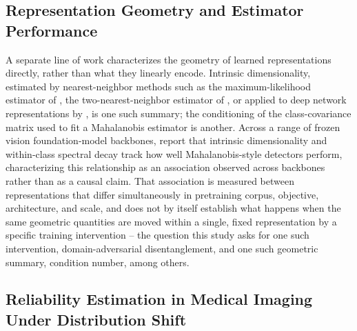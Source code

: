 \subsection{Representation Geometry and Estimator Performance}
\label{sec:rw-geometry}

A separate line of work characterizes the geometry of learned representations directly, rather than what they linearly encode. Intrinsic dimensionality, estimated by nearest-neighbor methods such as the maximum-likelihood estimator of \citet{levina2004maximum}, the two-nearest-neighbor estimator of \citet{facco2017estimating}, or applied to deep network representations by \citet{ansuini2019intrinsic}, is one such summary; the conditioning of the class-covariance matrix used to fit a Mahalanobis estimator is another. Across a range of frozen vision foundation-model backbones, \citet{janiak2026geometry} report that intrinsic dimensionality and within-class spectral decay track how well Mahalanobis-style detectors perform, characterizing this relationship as an association observed across backbones rather than as a causal claim. That association is measured between representations that differ simultaneously in pretraining corpus, objective, architecture, and scale, and does not by itself establish what happens when the same geometric quantities are moved within a single, fixed representation by a specific training intervention -- the question this study asks for one such intervention, domain-adversarial disentanglement, and one such geometric summary, condition number, among others.

\subsection{Reliability Estimation in Medical Imaging Under Distribution Shift}
\label{sec:rw-medical}

